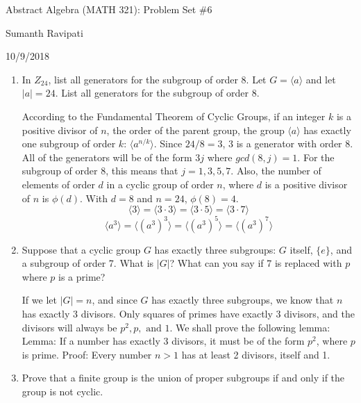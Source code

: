 \documentclass{article}
\begin{document}
\centerline{\Large Abstract Algebra (MATH 321): Problem Set \#6}
\centerline{Sumanth Ravipati}
\centerline{10/9/2018}
\vspace{.25in}

\begin{enumerate}
\item In $Z_{24}$, list all generators for the subgroup of order 8. Let $G = \langle a\rangle$ and let $|a| = 24$. List all generators for the subgroup of order 8.
\begin{flushleft}
According to the Fundamental Theorem of Cyclic Groups, if an integer $k$ is a positive divisor of $n$, the order of the parent group, the group $\langle a\rangle$ has exactly one subgroup of order $k$: $\langle a^{n/k}\rangle$. Since $24/8 = 3$, $3$ is a generator with order $8$. All of the generators will be of the form $3j$ where $gcd(8,j) = 1$. For the subgroup of order 8, this means that $j = 1, 3, 5, 7$. Also, the number of elements of order $d$ in a cyclic group of order $n$, where $d$ is a positive divisor of $n$ is $\phi(d)$. With $d = 8$ and $n = 24$, $\phi(8) = 4$.
$$\langle3\rangle = \langle3\cdot3\rangle = \langle3\cdot5\rangle = \langle3\cdot7\rangle$$
$$\langle a^3\rangle = \langle(a^3)^3\rangle = \langle(a^3)^5\rangle = \langle(a^3)^7\rangle$$
\end{flushleft}
\item Suppose that a cyclic group $G$ has exactly three subgroups: $G$ itself, $\{e\}$, and a subgroup of order 7. What is $|G|$? What can you say if 7 is replaced with $p$ where $p$ is a prime?
\begin{flushleft}
If we let $|G| = n$, and since $G$ has exactly three subgroups, we know that $n$ has exactly 3 divisors. Only squares of primes have exactly 3 divisors, and the divisors will always be $p^2, p, \text{ and } 1$. We shall prove the following lemma:\newline
Lemma: If a number has exactly 3 divisors, it must be of the form $p^2$, where $p$ is prime.\newline
Proof: Every number $n > 1$ has at least 2 divisors, itself and 1.
\end{flushleft}
\item Prove that a finite group is the union of proper subgroups if and only if the group is not cyclic.
\begin{flushleft}

\end{flushleft}
\end{enumerate}
\end{document}
